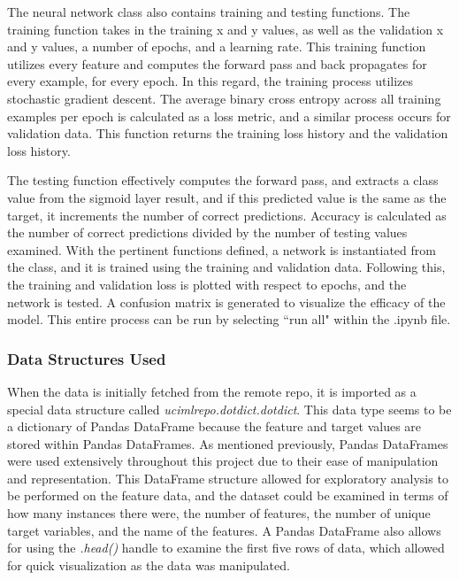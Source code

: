 \documentclass[a4paper]{article}
\begin{document}
The neural network class also contains training and testing functions. The training function takes in the training x and y values, as well as the validation x and y values, a number of epochs, and a learning rate. This training function utilizes every feature and computes the forward pass and back propagates for every example, for every epoch. In this regard, the training process utilizes stochastic gradient descent. The average binary cross entropy across all training examples per epoch is calculated as a loss metric, and a similar process occurs for validation data. This function returns the training loss history and the validation loss history. 

The testing function effectively computes the forward pass, and extracts a class value from the sigmoid layer result, and if this predicted value is the same as the target, it increments the number of correct predictions. Accuracy is calculated as the number of correct predictions divided by the number of testing values examined. With the pertinent functions defined, a network is instantiated from the class, and it is trained using the training and validation data. Following this, the training and validation loss is plotted with respect to epochs, and the network is tested. A confusion matrix is generated to visualize the efficacy of the model. This entire process can be run by selecting ``run all" within the .ipynb file.


\subsubsection{Data Structures Used}

When the data is initially fetched from the remote repo, it is imported as a special data structure called \textit{ucimlrepo.dotdict.dotdict}. This data type seems to be a dictionary of Pandas DataFrame because the feature and target values are stored within Pandas DataFrames. As mentioned previously, Pandas DataFrames were used extensively throughout this project due to their ease of manipulation and representation. This DataFrame structure allowed for exploratory analysis to be performed on the feature data, and the dataset could be examined in terms of how many instances there were, the number of features, the number of unique target variables, and the name of the features. A Pandas DataFrame also allows for using the \textit{.head()} handle to examine the first five rows of data, which allowed for quick visualization as the data was manipulated.
\end{document}
